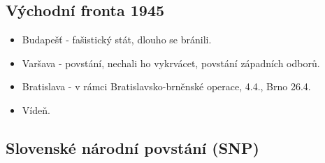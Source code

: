 \documentclass{article}
\begin{document}
\subsection*{Východní fronta 1945}
\begin{itemize}
    \item Budapešť - fašistický stát, dlouho se bránili.
    \item Varšava - povstání, nechali ho vykrvácet, povstání západních odborů.
    \item Bratislava - v rámci Bratislavsko-brněnské operace, 4.4., Brno 26.4.
    \item Vídeň.
\end{itemize}

\subsection*{Slovenské národní povstání (SNP)}
\end{document}
